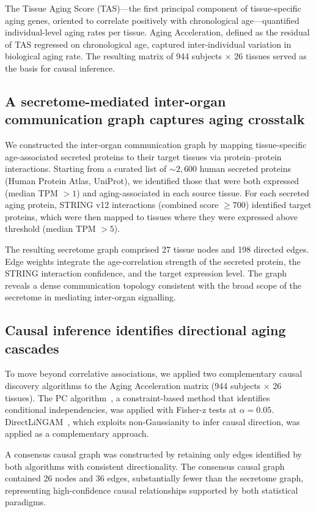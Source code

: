 \documentclass[11pt,a4paper]{article}
\begin{document}
The Tissue Aging Score (TAS)---the first principal component of tissue-specific aging genes, oriented to correlate positively with chronological age---quantified individual-level aging rates per tissue. Aging Acceleration, defined as the residual of TAS regressed on chronological age, captured inter-individual variation in biological aging rate. The resulting matrix of 944 subjects $\times$ 26 tissues served as the basis for causal inference.

\subsection*{A secretome-mediated inter-organ communication graph captures aging crosstalk}

We constructed the inter-organ communication graph by mapping tissue-specific age-associated secreted proteins to their target tissues via protein--protein interactions. Starting from a curated list of ${\sim}2{,}600$ human secreted proteins (Human Protein Atlas, UniProt), we identified those that were both expressed (median TPM $> 1$) and aging-associated in each source tissue. For each secreted aging protein, STRING v12 interactions (combined score $\geq 700$) identified target proteins, which were then mapped to tissues where they were expressed above threshold (median TPM $> 5$).

The resulting secretome graph comprised 27 tissue nodes and 198 directed edges. Edge weights integrate the age-correlation strength of the secreted protein, the STRING interaction confidence, and the target expression level. The graph reveals a dense communication topology consistent with the broad scope of the secretome in mediating inter-organ signalling.

\subsection*{Causal inference identifies directional aging cascades}

To move beyond correlative associations, we applied two complementary causal discovery algorithms to the Aging Acceleration matrix (944 subjects $\times$ 26 tissues). The PC algorithm~\cite{ref20}, a constraint-based method that identifies conditional independencies, was applied with Fisher-z tests at $\alpha = 0.05$. DirectLiNGAM~\cite{ref21}, which exploits non-Gaussianity to infer causal direction, was applied as a complementary approach.

A consensus causal graph was constructed by retaining only edges identified by both algorithms with consistent directionality. The consensus causal graph contained 26 nodes and 36 edges, substantially fewer than the secretome graph, representing high-confidence causal relationships supported by both statistical paradigms.
\end{document}
